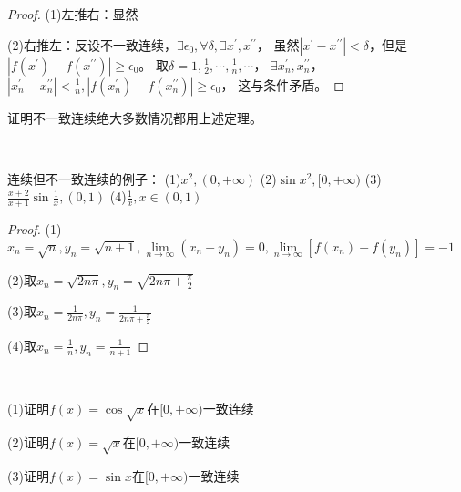 \begin{proof}
  (1)左推右：显然

  (2)右推左：反设不一致连续，$\exists \epsilon_0, \forall \delta, \exists x^{\prime}, x^{\prime\prime}$，
  虽然$|x^{\prime} - x^{\prime\prime}| < \delta$，但是
  $|f(x^{\prime}) - f(x^{\prime\prime})| \geq \epsilon_0$。
  取$\delta = 1,\frac{1}{2},\cdots,\frac{1}{n},\cdots$，
  $\exists x_n^{\prime},x_n^{\prime\prime}$，$|x_n^{\prime} - x_n^{\prime\prime}| < \frac{1}{n}, |f(x_n^{\prime}) - f(x_n^{\prime\prime})| \geq \epsilon_0$，
  这与条件矛盾。
\end{proof}

\begin{note}
  证明不一致连续绝大多数情况都用上述定理。
\end{note}

~

\begin{exercise}
  连续但不一致连续的例子：
  (1)$x^2, (0,+\infty)$
  (2)$\sin x^2, [0,+\infty)$
  (3)$\frac{x+2}{x+1}\sin \frac{1}{x}, (0,1)$
  (4)$\frac{1}{x}, x \in (0,1)$
\end{exercise}

\begin{proof}
  (1)$x_n = \sqrt{n}, y_n = \sqrt{n+1}, \lim \limits _{n \rightarrow \infty} (x_n - y_n) = 0, \lim \limits _{n \rightarrow \infty} [f(x_n) - f(y_n)]  = -1$

  (2)取$x_n = \sqrt{2n\pi}, y_n = \sqrt{2n\pi + \frac{\pi}{2}}$

  (3)取$x_n = \frac{1}{2n\pi}, y_n = \frac{1}{2n\pi + \frac{\pi}{2}}$

  (4)取$x_n = \frac{1}{n}, y_n = \frac{1}{n+1}$
\end{proof}

~

\begin{exercise}[一致连续的证明]
  (1)证明$f(x) = \cos \sqrt{x}$在$[0,+\infty)$一致连续

  (2)证明$f(x) = \sqrt{x}$在$[0,+\infty)$一致连续

  (3)证明$f(x) = \sin x$在$[0,+\infty)$一致连续
\end{exercise}

